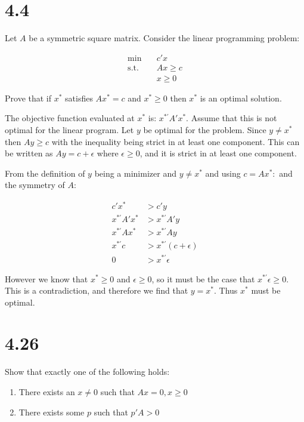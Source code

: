 \documentclass[12pt]{paper}
\begin{document}
\section{4.4}

Let $A$ be a symmetric square matrix. Consider the linear programming
problem:

\begin{align*}
  \min \quad & c'x\\
  \text{s.t. } & Ax \geq c\\
  & x \geq 0
\end{align*}

Prove that if $x^{*}$ satisfies $Ax^{*} = c$ and $x^{*} \geq 0$ then
$x^{*}$ is an optimal solution.

\vspace{.3in}

The objective function evaluated at $x^{*}$ is:
$x^{*\prime} A' x^{*}$.  Assume that this is not optimal for the linear
program. Let $y$ be optimal for the problem. Since $y \neq x^{*}$ then
$Ay \geq c$ with the inequality being strict in at least one
component. This can be written as $Ay = c + \epsilon$ where
$\epsilon \geq 0$, and it is strict in at least one component.

From the definition of $y$ being a minimizer and $y \neq x^{*}$ and using
$c = Ax^{*}:$ and the symmetry of $A$:

\begin{align*}
  c' x^{*} &> c' y\\
  x^{*\prime} A' x^{*} &> x^{*\prime} A' y\\
  x^{*\prime} A x^{*} &> x^{*\prime} A y\\
  x^{*\prime} c &>  x^{*\prime} ( c + \epsilon)\\
  0 &> x^{*\prime} \epsilon
\end{align*}

However we know that $x^{*} \geq 0$ and $\epsilon \geq 0$, so it must be the case
that $x^{*\prime}\epsilon \geq 0$. This is a contradiction, and therefore we find
that $y = x^{*}$. Thus $x^{*}$ must be optimal.

\section{4.26}

Show that exactly one of the following holds:

\begin{enumerate}
\item There exists an $x \neq 0$ such that $Ax = 0, x \geq 0$
\item There exists some $p$ such that $p'A > 0$
\end{enumerate}
\end{document}
